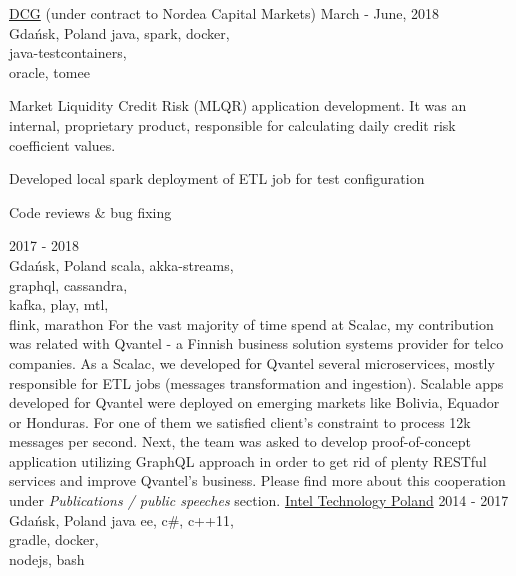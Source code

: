 \documentclass[a4paper,11pt]{cv4tw}%
\begin{document}
      {\href{https://diversecg.pl/}{DCG} (under contract to Nordea Capital Markets)}
      {March - June, 2018\\Gdańsk, Poland}
      {java, spark, docker,\\java-testcontainers,\\oracle, tomee}
      {Market Liquidity Credit Risk (MLQR) application development. It was an internal,
        proprietary product, responsible for calculating daily credit risk
        coefficient values.
        \begin{missions}
        \item Developed local spark deployment of ETL job for test configuration
        \item Code reviews \& bug fixing
        \end{missions}
      }
      {2017 - 2018\\Gdańsk, Poland}
      {scala, akka-streams,\\graphql, cassandra,\\kafka, play, mtl,\\flink, marathon}
      {For the vast majority of time spend at Scalac, my contribution was related with Qvantel - a Finnish business solution systems provider for telco companies.
        As a Scalac, we developed for Qvantel several microservices, mostly responsible for ETL jobs (messages transformation and ingestion).
        Scalable apps developed for Qvantel were deployed on emerging markets like Bolivia, Equador or Honduras. For one of them we satisfied client's constraint
        to process \approx12k messages per second. Next, the team was asked to develop proof-of-concept application utilizing GraphQL approach in order to get
        rid of plenty RESTful services and improve Qvantel's business. Please find more about this cooperation under \emph{Publications / public speeches} section.
      }
      {\href{https://www.intel.com/content/www/us/en/jobs/locations/poland.html}
        {Intel Technology Poland}}
      {2014 - 2017\\Gdańsk, Poland}
      {java ee, c\#, c++11,\\gradle, docker,\\nodejs, bash}
\end{document}
